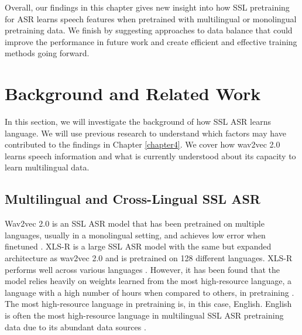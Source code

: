 Overall, our findings in this chapter gives new insight into how SSL pretraining for ASR learns speech features when pretrained with multilingual or monolingual pretraining data. We finish by suggesting approaches to data balance that could improve the performance in future work and create efficient and effective training methods going forward.
\fi

\newpage
\section{Background and Related Work}\label{ed_sec:background}

In this section, we will investigate the background of how SSL ASR learns language. We will use previous research to understand which factors may have contributed to the findings in Chapter \ref{chapter4}. We cover how wav2vec 2.0 learns speech information and what is currently understood about its capacity to learn multilingual data.

\subsection{Multilingual and Cross-Lingual SSL ASR}
Wav2vec 2.0 is an SSL ASR model that has been pretrained on multiple languages, usually in a monolingual setting, and achieves low error when finetuned \cite{wav2vec}. XLS-R \cite{babu2021xlsr} is a large SSL ASR model with the same but expanded architecture as wav2vec 2.0 \cite{vaswani2017attention} and is pretrained on 128 different languages. XLS-R performs well across various languages \cite{FLEURS_XLSR_WHISPER}. However, it has been found that the model relies heavily on weights learned from the most high-resource language, a language with a high number of hours when compared to others, in pretraining \cite{storeyedbiasSSL}. The most high-resource language in pretraining is, in this case, English. English is often the most high-resource language in multilingual SSL ASR pretraining data due to its abundant data sources \cite{librispeech, librilight, MLS, wang-etal-2021-voxpopuli}.

